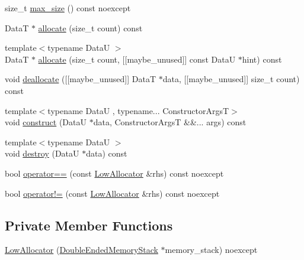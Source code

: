 \begin{DoxyCompactItemize}
\item 
size\+\_\+t \hyperlink{structmage_1_1_double_ended_memory_stack_1_1_low_allocator_a3c93f7d3dd550ab89dbb147d0c4e8294}{max\+\_\+size} () const noexcept
\item 
DataT $\ast$ \hyperlink{structmage_1_1_double_ended_memory_stack_1_1_low_allocator_a447a18b6db5720cac0f8ffcf09eb7446}{allocate} (size\+\_\+t count) const
\item 
{\footnotesize template$<$typename DataU $>$ }\\DataT $\ast$ \hyperlink{structmage_1_1_double_ended_memory_stack_1_1_low_allocator_a583da1f43e228462faca5876581474c8}{allocate} (size\+\_\+t count, \mbox{[}\mbox{[}maybe\+\_\+unused\mbox{]}\mbox{]} const DataU $\ast$hint) const
\item 
void \hyperlink{structmage_1_1_double_ended_memory_stack_1_1_low_allocator_a02dd6ae407fc9114eb4e90b7313fb45a}{deallocate} (\mbox{[}\mbox{[}maybe\+\_\+unused\mbox{]}\mbox{]} DataT $\ast$data, \mbox{[}\mbox{[}maybe\+\_\+unused\mbox{]}\mbox{]} size\+\_\+t count) const
\item 
{\footnotesize template$<$typename DataU , typename... Constructor\+ArgsT$>$ }\\void \hyperlink{structmage_1_1_double_ended_memory_stack_1_1_low_allocator_ad973ac339f277f0b953a439e2123ad83}{construct} (DataU $\ast$data, Constructor\+ArgsT \&\&... args) const
\item 
{\footnotesize template$<$typename DataU $>$ }\\void \hyperlink{structmage_1_1_double_ended_memory_stack_1_1_low_allocator_a05981dee12d02f10a96427f8bd44344d}{destroy} (DataU $\ast$data) const
\item 
bool \hyperlink{structmage_1_1_double_ended_memory_stack_1_1_low_allocator_abffbd099f822e3c83daa438416dbbb7b}{operator==} (const \hyperlink{structmage_1_1_double_ended_memory_stack_1_1_low_allocator}{Low\+Allocator} \&rhs) const noexcept
\item 
bool \hyperlink{structmage_1_1_double_ended_memory_stack_1_1_low_allocator_a10c035b18789076905b91b3237db83ab}{operator!=} (const \hyperlink{structmage_1_1_double_ended_memory_stack_1_1_low_allocator}{Low\+Allocator} \&rhs) const noexcept
\end{DoxyCompactItemize}
\subsection*{Private Member Functions}
\begin{DoxyCompactItemize}
\item 
\hyperlink{structmage_1_1_double_ended_memory_stack_1_1_low_allocator_a7c9da2fad702eedb0bb16de047c99238}{Low\+Allocator} (\hyperlink{classmage_1_1_double_ended_memory_stack}{Double\+Ended\+Memory\+Stack} $\ast$memory\+\_\+stack) noexcept
\end{DoxyCompactItemize}
